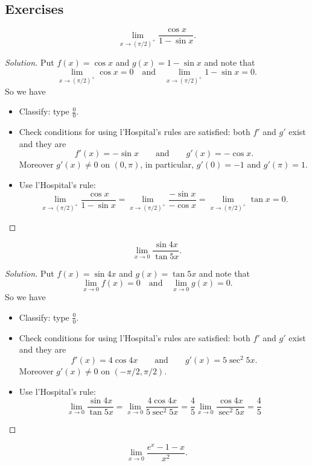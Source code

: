 \subsection{Exercises}
\begin{exercise*}[\S4.4, \#11]
\[
\lim_{x\to(\pi/2)^+}\frac{\cos x}{1-\sin x}.
\]
\end{exercise*}
\begin{proof}[Solution]
Put $f(x)=\cos x$ and $g(x)=1-\sin x$ and note that
\[
\lim_{x\to(\pi/2)^+}\cos x=0
\quad\text{and}\quad
\lim_{x\to(\pi/2)^+}1-\sin x=0.\]
So we have
\begin{itemize}[noitemsep]
\item Classify: type $\frac{0}{0}$.
\item Check conditions for using l'Hospital's rules are
  satisfied: both $f'$ and $g'$ exist and they are
  \[
    f'(x)=-\sin x\qquad\text{and}\qquad g'(x)=-\cos x.
  \]
Moreover $g'(x)\neq 0$ on $(0,\pi)$, in particular, $g'(0)=-1$
and $g'(\pi)=1$.
\item Use l'Hospital's rule:
\[
\lim_{x\to(\pi/2)^+}\frac{\cos x}{1-\sin
  x}=\lim_{x\to(\pi/2)^+}\frac{-\sin x}{-\cos
  x}=\lim_{x\to(\pi/2)^+}\tan x=0.
\]
\end{itemize}
\end{proof}
\begin{exercise*}[\S4.4, \#12]
\[
\lim_{x\to 0}\frac{\sin 4x}{\tan 5x}.
\]
\end{exercise*}
\begin{proof}[Solution]
Put $f(x)=\sin 4x$ and $g(x)=\tan 5x$ and note that
\[
\lim_{x\to 0}f(x)=0
\quad\text{and}\quad
\lim_{x\to 0}g(x)=0.\]
So we have
\begin{itemize}[noitemsep]
\item Classify: type $\frac{0}{0}$.
\item Check conditions for using l'Hospital's rules are
  satisfied: both $f'$ and $g'$ exist and they are
  \[
    f'(x)=4\cos 4x\qquad\text{and}\qquad g'(x)=5\sec^2 5x.
  \]
Moreover $g'(x)\neq 0$ on $(-\pi/2,\pi/2)$.
\item Use l'Hospital's rule:
\[
\lim_{x\to 0}\frac{\sin 4x}{\tan 5x}
=\lim_{x\to 0}\frac{4\cos 4x}{5\sec^2 5x}
=\frac{4}{5}\lim_{x\to 0}\frac{\cos 4x}{\sec^2 5x}
=\frac{4}{5}
\]
\end{itemize}
\end{proof}
\begin{exercise*}[\S4.4, \#25]
\[
\lim_{x\to 0}\frac{e^x-1-x}{x^2}.
\]
\end{exercise*}
